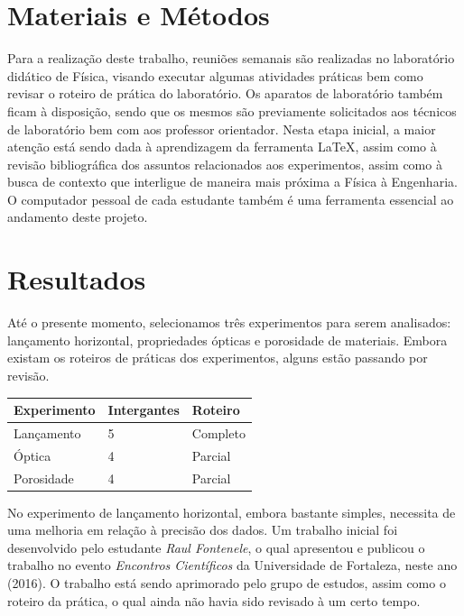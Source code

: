 \documentclass[portrait,a0]{a0poster}
\begin{document}
\begin{multicols}{2}
\section*{Materiais e Métodos}

Para a realização deste trabalho, reuniões semanais são realizadas no laboratório didático de Física, visando executar algumas atividades práticas bem como revisar o roteiro de prática do laboratório.
Os aparatos de laboratório também ficam à disposição, sendo que os mesmos são previamente solicitados aos técnicos de laboratório bem com aos professor orientador.
Nesta etapa inicial, a maior atenção está sendo dada à aprendizagem da ferramenta \LaTeX, assim como à revisão bibliográfica dos assuntos relacionados aos experimentos, assim como à busca de contexto que interligue de maneira mais próxima a Física à Engenharia.
O computador pessoal de cada estudante também é uma ferramenta essencial ao andamento deste projeto.



\section*{Resultados}

Até o presente momento, selecionamos três experimentos para serem analisados: lançamento horizontal, propriedades ópticas e porosidade de materiais.
Embora existam os roteiros de práticas dos experimentos, alguns estão passando por revisão.
%
\begin{table} %
\begin{tabular}{l l l}
\toprule
\textbf{Experimento} & \textbf{Intergantes} & \textbf{Roteiro}\\
\midrule
Lançamento & 5 & Completo\\
Óptica & 4 & Parcial \\
Porosidade & 4 & Parcial \\
\bottomrule
\end{tabular}
\end{table}
%
No experimento de lançamento horizontal, embora bastante simples, necessita de uma melhoria em relação à precisão dos dados.
Um trabalho inicial foi desenvolvido pelo estudante \emph{Raul Fontenele}, o qual apresentou e publicou o trabalho no evento \emph{Encontros Científicos} da Universidade de Fortaleza, neste ano (2016).
O trabalho está sendo aprimorado pelo grupo de estudos, assim como o roteiro da prática, o qual ainda não havia sido revisado à um certo tempo.



\end{multicols}
\end{document}
